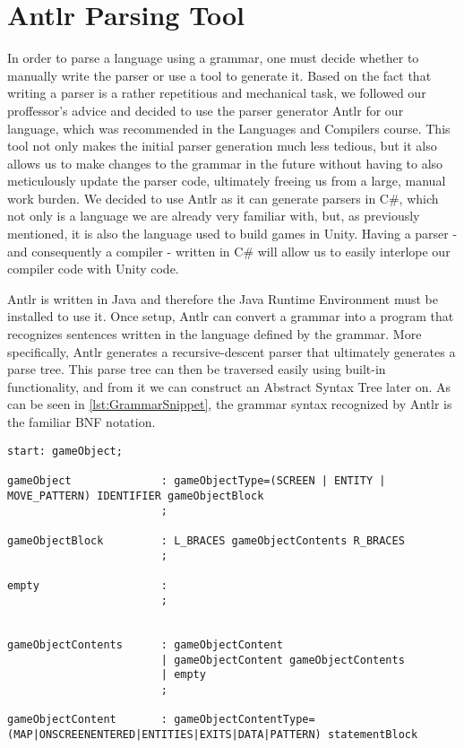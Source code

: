 \section{Antlr Parsing Tool}\label{sec:antlrTool}
In order to parse a language using a grammar, one must decide whether to manually write the parser or use a tool to generate it\cite{crafting_a_compiler}.
Based on the fact that writing a parser is a rather repetitious and mechanical task, we followed our proffessor's advice and decided to use the parser generator Antlr for our language, which was recommended in the Languages and Compilers course. 
This tool not only makes the initial parser generation much less tedious, but it also allows us to make changes to the grammar in the future without having to also meticulously update the parser code, ultimately freeing us from a large, manual work burden.
We decided to use Antlr as it can generate parsers in C\#, which not only is a language we are already very familiar with, but, as previously mentioned, it is also the language used to build games in Unity. Having a parser - and consequently a compiler - written in C\# will allow us to easily interlope our compiler code with Unity code.


Antlr is written in Java and therefore the Java Runtime Environment must be installed to use it. 
Once setup, Antlr can convert a grammar into a program that recognizes sentences written in the language defined by the grammar.
More specifically, Antlr generates a recursive-descent parser that ultimately generates a parse tree.
This parse tree can then be traversed easily using built-in functionality, and from it we can construct an Abstract Syntax Tree later on.
As can be seen in \ref{lst:GrammarSnippet}, the grammar syntax recognized by Antlr is the familiar BNF notation.


\begin{lstlisting}[caption={A snippet of the \dazel{} grammar used by Antlr to generate the parser}, label={lst:GrammarSnippet}]
start: gameObject;

gameObject              : gameObjectType=(SCREEN | ENTITY | MOVE_PATTERN) IDENTIFIER gameObjectBlock
						;
						
gameObjectBlock         : L_BRACES gameObjectContents R_BRACES
						;

empty                   : 
						;


gameObjectContents      : gameObjectContent
						| gameObjectContent gameObjectContents
						| empty
						;

gameObjectContent       : gameObjectContentType=(MAP|ONSCREENENTERED|ENTITIES|EXITS|DATA|PATTERN) statementBlock 
\end{lstlisting}

